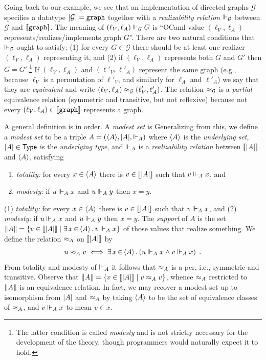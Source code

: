 Going back to our example, we see that an implementation of directed
graphs $\mathcal{G}$ specifies a datatype $|\mathcal{G}| =
\mathtt{graph}$ together with a \emph{realizability relation}
$\Vdash_{\mathcal{G}}$ between $\mathcal{G}$ and
$[\![\mathtt{graph}]\!]$. The meaning of $(\ell_V, \ell_A)
\Vdash_\mathcal{G} G$ is ``OCaml value $(\ell_V, \ell_A)$
represents/realizes/implements graph $G$''.
%
\iflong
%
There are two natural
conditions that $\Vdash_\mathcal{G}$ ought to satisfy: (1) for every $G
\in \mathcal{G}$ there should be at least one realizer $(\ell_V,
\ell_A)$ representing it, and (2) if $(\ell_V, \ell_A)$ represents
both $G$ and $G'$ then $G = G'$.\footnote{The latter condition is
  called \emph{modesty} and is not strictly necessary for the
  development of the theory, though programmers would naturally expect
  it to hold.} If $(\ell_V, \ell_A)$ and $(\ell'_V, \ell'_A)$
represent the same graph (e.g., because $\ell_V$ is a permutation of
$\ell'_V$, and similarly for $\ell_A$ and $\ell'_A$) we say that they
are \emph{equivalent} and write $(\ell_V, \ell_A) \approx_\mathcal{G}
(\ell'_V, \ell'_A)$. The relation $\approx_\mathcal{G}$ is a
\emph{partial} equivalence relation (symmetric and transitive, but not
reflexive) because not every $(\ell_V, \ell_A) \in
[\![\mathtt{graph}]\!]$ represents a graph.

\smallskip

A general definition is in order. A \emph{modest set} is 
%
\else %
%
Generalizing from this, we define a \emph{modest set} to be
%
\fi
%
a triple $A = (\langle A \rangle, |A|, {\Vdash_A})$ where $\langle A \rangle$ is
the \emph{underlying set}, $|A| \in \mathsf{Type}$ is the
\emph{underlying type}, and $\Vdash_A$ is a \emph{realizability relation}
between $[\![|A|]\!]$ and $\langle A \rangle$, satisfying
%
\iflong
% 
\begin{enumerate}
\item \emph{totality:} for every $x \in \langle A \rangle$ there is $v \in
  [\![|A|]\!]$ such that $v \Vdash_A x$, and
\item \emph{modesty:} if $u \Vdash_A x$ and $u \Vdash_A y$ then $x = y$.
\end{enumerate}
%
\else %
%
(1) \emph{totality:} for every $x \in \langle A \rangle$ there is $v \in
[\![|A|]\!]$ such that $v \Vdash_A x$, and (2) \emph{modesty:} if
$u \Vdash_A x$ and $u \Vdash_A y$ then $x = y$.
%
\fi %
%
The \emph{support} of $A$ is the set $\|A\| = \{v \in
  [\![|A|]\!] \mid \exists\, x \,{\in}\, \langle A \rangle\,.\,v \Vdash_A x\}$ of those
values that realize something. We define the relation $\approx_A$ on
$[\![|A|]\!]$ by
%
\begin{equation*}
  u \approx_A v
  \iff
  \exists\, x \,{\in}\, \langle A \rangle\,.\left(u \Vdash_A x \land v \Vdash_A x\right) \;.
\end{equation*}
%
From totality and modesty of $\Vdash_A$ it follows that $\approx_A$ is a per,
i.e., symmetric and transitive. Observe that $\|A\| = \{v \in
  [\![|A|]\!] \mid v \approx_A v\}$, whence $\approx_A$
restricted to $\|A\|$ is an equivalence relation. In fact, we
may recover a modest set up to isomorphism from $|A|$ and
$\approx_A$ by taking $\langle A \rangle$ to be the set of equivalence classes of
$\approx_A$, and $v \Vdash_A x$ to mean $v \in x$.

